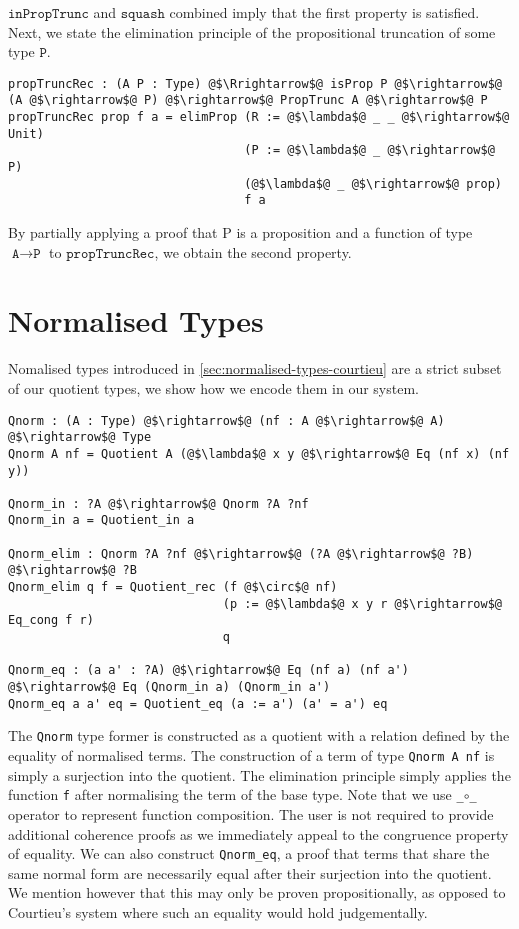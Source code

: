 \documentclass[12pt,twoside,maitrise]{dms}
\theoremstyle{definition}
\numberwithin{equation}{section}
\numberwithin{table}{chapter}
\numberwithin{figure}{chapter}
\newcommand\id[1] {\texttt{#1}}
\newcommand\fn[1] {\texttt{#1}}
\begin{document}
$\id{inPropTrunc}$ and $\id{squash}$ combined imply that the first property is satisfied. Next, we state the elimination principle of the propositional truncation of some type $\id{P}$.

\begin{verbatim}
propTruncRec : (A P : Type) @$\Rrightarrow$@ isProp P @$\rightarrow$@ (A @$\rightarrow$@ P) @$\rightarrow$@ PropTrunc A @$\rightarrow$@ P
propTruncRec prop f a = elimProp (R := @$\lambda$@ _ _ @$\rightarrow$@ Unit)
                                 (P := @$\lambda$@ _ @$\rightarrow$@ P)
                                 (@$\lambda$@ _ @$\rightarrow$@ prop)
                                 f a
\end{verbatim}

By partially applying a proof that P is a proposition and a function of type
$\id{A} \rightarrow \id{P}$ to $\id{propTruncRec}$, we obtain the second
property.

\section{Normalised Types}

Nomalised types introduced in \autoref{sec:normalised-types-courtieu} are a
strict subset of our quotient types, we show how we encode them in our system.

\begin{verbatim}
Qnorm : (A : Type) @$\rightarrow$@ (nf : A @$\rightarrow$@ A) @$\rightarrow$@ Type
Qnorm A nf = Quotient A (@$\lambda$@ x y @$\rightarrow$@ Eq (nf x) (nf y))

Qnorm_in : ?A @$\rightarrow$@ Qnorm ?A ?nf
Qnorm_in a = Quotient_in a

Qnorm_elim : Qnorm ?A ?nf @$\rightarrow$@ (?A @$\rightarrow$@ ?B) @$\rightarrow$@ ?B
Qnorm_elim q f = Quotient_rec (f @$\circ$@ nf)
                              (p := @$\lambda$@ x y r @$\rightarrow$@ Eq_cong f r)
                              q

Qnorm_eq : (a a' : ?A) @$\rightarrow$@ Eq (nf a) (nf a') @$\rightarrow$@ Eq (Qnorm_in a) (Qnorm_in a')
Qnorm_eq a a' eq = Quotient_eq (a := a') (a' = a') eq
\end{verbatim}

The \id{Qnorm} type former is constructed as a quotient with a relation defined
by the equality of normalised terms. The construction of a term of type
\id{Qnorm A nf} is simply a surjection into the quotient. The elimination
principle simply applies the function \id{f} after normalising the term of the
base type. Note that we use \fn{_$\circ$_} operator to represent function
composition. The user is not required to provide additional coherence proofs as
we immediately appeal to the congruence property of equality. We can also
construct \id{Qnorm\_eq}, a proof that terms that share the same normal form are
necessarily equal after their surjection into the quotient. We mention however
that this may only be proven propositionally, as opposed to Courtieu's system
where such an equality would hold judgementally.
\end{document}
